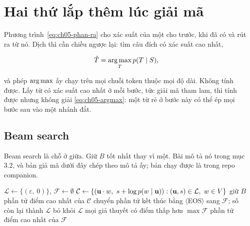 \section{Hai thứ lắp thêm lúc giải mã}
\label{sec:ch05-giai-ma}

%
Phương trình~\eqref{eq:ch05-phan-ra} cho xác suất của một
 cho trước, khi đã có
 và  rút ra
từ nó. Dịch thì cần chiều ngược lại: tìm câu đích có xác suất cao nhất,

\begin{equation}
  \hat{T} = \operatorname*{arg\,max}_{T} p(T \mid S),
  \label{eq:ch05-argmax}
\end{equation}

và phép \(\operatorname*{arg\,max}\) ấy chạy trên mọi chuỗi token thuộc mọi độ dài. Không tính
được. Lấy từ có xác suất cao nhất ở mỗi bước, tức giải mã tham lam, thì tính
được nhưng không giải \eqref{eq:ch05-argmax}: một từ rẻ ở bước này có thể ép mọi
bước sau vào một nhánh đắt.

\subsection*{Beam search}

%
Beam search là chỗ ở giữa. Giữ \(B\)  tốt nhất thay
vì một. Bài mô tả nó trong mục 3.2, và bản giả mã dưới đây chép theo mô tả ấy;
bản chạy được là  trong repo companion.

\begin{algorithm}[htbp]
  \caption{Beam search, giả mã theo mô tả ở mục 3.2 của bài báo}
  \label{alg:ch05-beam}
  \begin{algorithmic}[1]
    \State \(\mathcal{L} \gets \{(\varepsilon,\ 0)\}\),
           \(\mathcal{F} \gets \emptyset\)
      \State \(\mathcal{C} \gets \{(\mathbf{u} \cdot w,\ s + \log p(w \mid \mathbf{u}))
              : (\mathbf{u}, s) \in \mathcal{L},\ w \in V\}\)
      \State giữ \(B\) phần tử điểm cao nhất của \(\mathcal{C}\)
      \State chuyển phần tử kết thúc bằng \(\langle\)EOS\(\rangle\) sang
             \(\mathcal{F}\); số còn lại thành \(\mathcal{L}\)
      \State bỏ khỏi \(\mathcal{L}\) mọi giả thuyết có điểm thấp hơn
             \(\max \mathcal{F}\)
    \EndWhile
    \State \Return phần tử điểm cao nhất của \(\mathcal{F}\)
  \end{algorithmic}
\end{algorithm}

